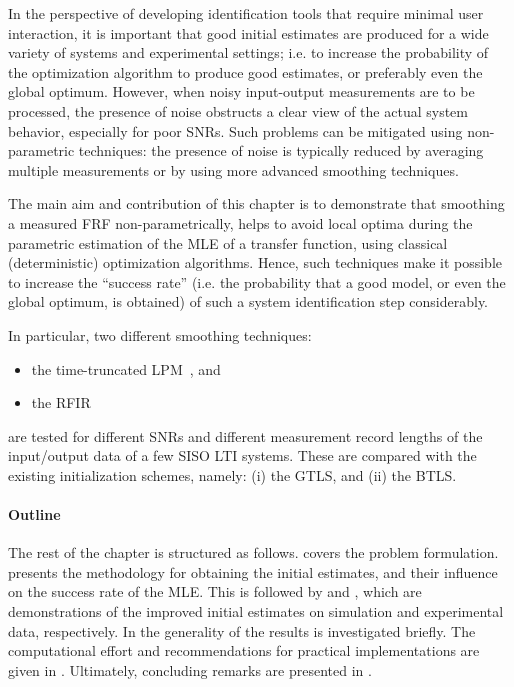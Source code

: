  In the perspective of developing identification tools that require minimal user interaction, it is important that good initial estimates are produced for a wide variety of systems and experimental settings; i.e. to increase the probability of the optimization algorithm to produce good estimates, or preferably even the global optimum.
 However, when noisy input-output measurements are to be processed, the presence of noise obstructs a clear view of the actual system behavior, especially for poor \glspl{SNR}.
 Such problems can be mitigated using non-parametric techniques: the presence of noise is typically reduced by averaging multiple measurements or by using more advanced smoothing techniques.

The main aim and contribution of this chapter is to demonstrate that smoothing a measured \gls{FRF} non-parametrically, helps to avoid local optima during the parametric estimation of the \gls{MLE} of a transfer function, using classical (deterministic) optimization algorithms.
Hence, such techniques make it possible to increase the ``success rate'' (i.e. the probability that a good model, or even the global optimum, is obtained) of such a system identification step considerably.

In particular, two different smoothing techniques:
\begin{itemize}
 \item the time-truncated \gls{LPM}~\citep{Lumori2014TIM}, and
 \item the \gls{RFIR}~\citep{Pillonetto2010,Chen2012}
\end{itemize}
are tested for different \glspl{SNR} and different measurement record lengths of the input/output data of a few \gls{SISO} \gls{LTI} systems.
These are compared with the existing initialization schemes, namely: (i) the \gls{GTLS}, and (ii) the \gls{BTLS}.

\paragraph{Outline}
The rest of the chapter is structured as follows. 
 covers the problem formulation. 
 presents the methodology for obtaining the initial estimates, and their influence on the success rate of the \gls{MLE}. 
This is followed by  and , which are demonstrations of the improved initial estimates on simulation and experimental data, respectively.
In  the generality of the results is investigated briefly.
The computational effort and recommendations for practical implementations are given in .
Ultimately, concluding remarks are presented in .

